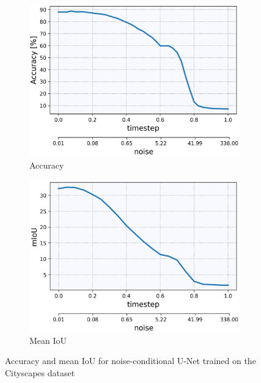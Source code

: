 %
\begin{figure}[] \label{fig:3.2}
    \centering
    \begin{subfigure}[b]{0.49\textwidth}
        \centering
         \includegraphics[width=\textwidth]{Chapters/figures/experiments/cityscapes/accuracy_cityscapes.PNG}
         \caption{Accuracy}
    \end{subfigure}
    \begin{subfigure}[b]{0.49\textwidth}
        \centering
         \includegraphics[width=\textwidth]{Chapters/figures/experiments/cityscapes/mIoU_cityscapes.PNG}
         \caption{Mean IoU}
    \end{subfigure}
    \caption[Short-form caption]{Accuracy and mean IoU for noise-conditional U-Net trained on the Cityscapes dataset}
\end{figure}
%

